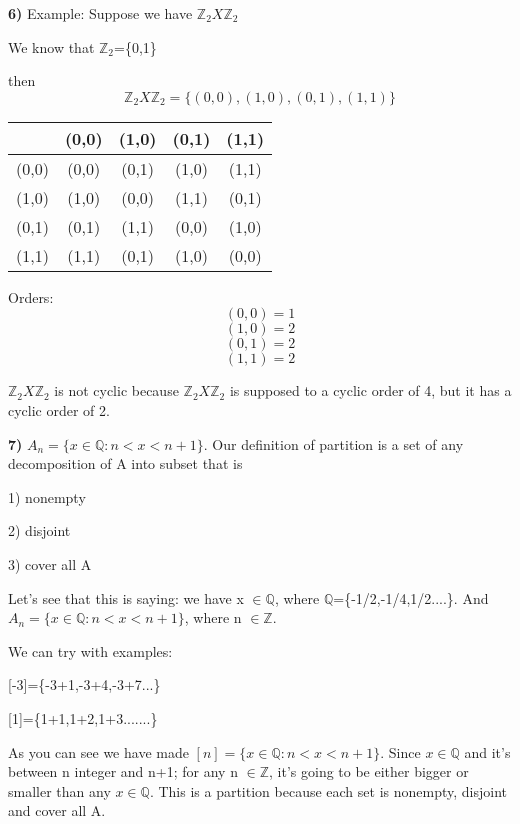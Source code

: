 \documentclass{article}
\begin{document}
\textbf{6)} Example: Suppose we have $\mathbb{Z}_{2}X\mathbb{Z}_{2}$

\medskip

We know that $\mathbb{Z}_{2}$=\{0,1\}

then  $$\mathbb{Z}_{2}X\mathbb{Z}_{2}=\{(0,0),(1,0),(0,1),(1,1)\}$$

\begin{table}[ht]
	\begin{tabular}{|c| |c| |c| |c| |c|}	
	\hline
	& (0,0) & (1,0) &  (0,1)  &(1,1) \\
	\hline
	(0,0) & (0,0) & (0,1) &  (1,0)  &(1,1) \\
	\hline
	(1,0) & (1,0) &(0,0) &(1,1) & (0,1) \\
	\hline
	(0,1) & (0,1) & (1,1) & (0,0) & (1,0) \\
	\hline
	(1,1) & (1,1) & (0,1) & (1,0) & (0,0) 
	\end{tabular}
\end{table}

Orders: $$ (0,0)=1$$
$$(1,0)=2$$
$$(0,1)=2$$
$$(1,1)=2$$

$\mathbb{Z}_{2}X\mathbb{Z}_{2}$ is not cyclic because  $\mathbb{Z}_{2}X\mathbb{Z}_{2}$ is supposed to a cyclic order of 4, but it has a cyclic order of 2. 


\newpage
\textbf{7)} $A_{n}=\{x \in \mathbb{Q} : n <x < n+1\}$. Our definition of partition is a set of any decomposition of A into subset that is 

1) nonempty

2) disjoint

3) cover all A

\medskip

Let's see that this is saying: we have x $\in \mathbb{Q}$, where $\mathbb{Q}$=\{-1/2,-1/4,1/2....\}. And $A_{n}=\{x \in \mathbb{Q} : n <x < n+1\}$, where n $\in \mathbb{Z}$.

\medskip
We can try with examples:

\medskip

[-3]=\{-3+1,-3+4,-3+7...\}

\medskip

[1]=\{1+1,1+2,1+3.......\}

\medskip
 
As you can see we have made $[n]=\{x \in \mathbb{Q} : n <x < n+1\}$. Since $x \in \mathbb{Q}$ and it's between n integer and n+1; for any n $\in \mathbb{Z}$, it's going to be either bigger or smaller than any $x \in \mathbb{Q}$. This is a partition because each set is nonempty, disjoint and cover all A.
   
\end{document}

